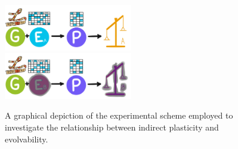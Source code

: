 \begin{figure}
    \centering
    \includegraphics[width=0.5\textwidth]{img/indirectschemeA} \\
    \includegraphics[width=0.5\textwidth]{img/indirectschemeB}
  \caption{A graphical depiction of the experimental scheme employed to investigate the relationship between indirect plasticity and evolvability.}
  \label{fig:indirect_plasticity_scheme}
\end{figure}